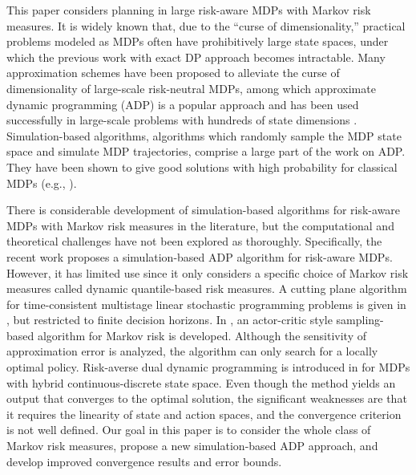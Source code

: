 \documentclass[12pt,technote,onecolumn]{IEEEtran}
\begin{document}
This paper considers planning in large risk-aware MDPs with Markov risk measures. It is widely known that, due to the ``curse of dimensionality,'' practical problems modeled as MDPs often have prohibitively large state spaces, under which the previous work \cite{ruszczynski2010risk} with exact DP approach becomes intractable. Many approximation schemes have been proposed to alleviate the curse of dimensionality of large-scale risk-neutral MDPs, among which approximate dynamic programming (ADP) is a popular approach and has been used successfully in large-scale problems with hundreds of state dimensions  \cite{powell2007approximate}. Simulation-based algorithms, algorithms which randomly sample the MDP state space and simulate MDP trajectories, comprise a large part of the work on ADP. They have been shown to give good solutions with high probability for classical MDPs (e.g., \cite{de2003linear,munos2008finite,rust1997using,Haskell_EDP_2015}). 

There is considerable development of simulation-based algorithms for risk-aware MDPs with Markov risk measures in the literature, but the computational and theoretical challenges have not been explored as thoroughly. Specifically, the recent work \cite{jiang2015approximate} proposes a simulation-based ADP algorithm for risk-aware MDPs. However, it has limited use since it only considers a specific choice of Markov risk measures called dynamic quantile-based risk measures. A cutting plane algorithm for time-consistent multistage linear stochastic programming problems is given in \cite{asamov2014time}, but restricted to finite decision horizons. In \cite{tamar2016sequential}, an actor-critic style sampling-based algorithm for Markov risk is developed. Although the sensitivity of approximation error is analyzed, the algorithm can only search for a locally optimal policy. Risk-averse dual dynamic programming is introduced in \cite{Petrik:2012} for MDPs with hybrid continuous-discrete state space. Even though the method yields an output that converges to the optimal solution, the significant weaknesses are that it requires the linearity of state and action spaces, and the convergence criterion is not well defined. Our goal in this paper is to consider the whole class of Markov risk measures, propose a new simulation-based ADP approach, and develop improved convergence results and error bounds.
\end{document}
